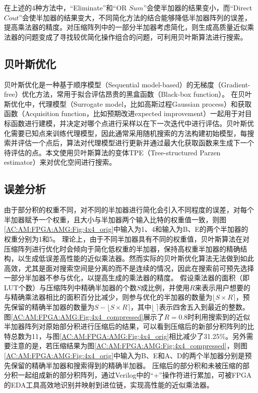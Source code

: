 在上述的4种方法中，“Eliminate”和“OR $Sum$”会使半加器的结果变小，而“Direct $Cout$”会使半加器的结果变大，不同简化方法的结合能够降低半加器阵列的误差，提高乘法器的精度。对压缩阵列中的一部分半加器考虑简化，则生成高质量近似乘法器的问题变成了寻找较优简化操作组合的问题，可利用贝叶斯算法进行搜索。

\subsection{贝叶斯优化}

贝叶斯优化\cite{BBO:BayesianNeuralIPS}是一种基于顺序模型（Sequential model-based）的无梯度（Gradient-free）优化方法，常用于拟合评估昂贵的黑盒函数（Black-box function）。
在贝叶斯优化中，代理模型（Surrogate model，比如高斯过程Gaussian process）和获取函数（Acquisition function，比如预期改进expected improvement）一起用于对目标函数进行建模，并决定对哪个点进行采样以在下一次迭代中进行评估。贝叶斯优化需要已知点来训练代理模型，因此通常采用随机搜索的方法构建初始模型，每搜索并评估一个点后，算法对代理模型进行更新并通过最大化获取函数来生成下一个待评估的点。本文使用贝叶斯算法的变体TPE（Tree-structured Parzen estimator）\cite{BBO:TPE}来对优化空间进行搜索。

\subsection{误差分析}

由于部分积的权重不同，对不同的半加器进行简化会引入不同程度的误差，对每个半加器赋予一个权重，且大小与半加器两个输入比特的权重值一致，则图\ref{AC:AM:FPGA:AMG:Fig:4x4_orig}中输入为1、4和输入为B、E的两个半加器的权重分别为1和5。
理论上，由于不同半加器具有不同的权重值，贝叶斯算法在对压缩阵列进行优化时会倾向于简化低权重的半加器，保持高权重半加器的精确结构，以生成低误差高性能的近似乘法器。然而实际的贝叶斯优化算法无法做到如此高效，尤其是面对搜索空间是分离的而不是连续的情况，因此在搜索前可预先选择一部分半加器不参与优化，以提高生成的乘法器的精度。
假设乘法器的面积（即LUT个数）与压缩阵列中精确半加器的个数$S$成比例，并使用$R$来表示用户想要的与精确乘法器相比的面积百分比减少，则参与优化的半加器的数量为$\lfloor S \times R \rceil$，预先保留的精确半加器的数量为$S - \lfloor S \times R \rceil$，其中$\lfloor \ \rceil$表示四舍五入到最近的整数。
图\ref{AC:AM:FPGA:AMG:Fig:4x4_compressed}展示了$R=0.8$时利用搜索到的近似半加器阵列对原始部分积进行压缩后的结果，可以看到压缩后的新部分积阵列的比特总数为11，与图\ref{AC:AM:FPGA:AMG:Fig:4x4_orig}相比减少了31.25\%。另外需要注意的是，若压缩结果为图\ref{AC:AM:FPGA:AMG:Fig:4x4_compressed}，则图\ref{AC:AM:FPGA:AMG:Fig:4x4_orig}中输入为B、E和A、D的两个半加器分别是预先保留的精确半加器和搜索得到的精确半加器。
压缩后的部分积和未被压缩的部分积一起组成新的部分积阵列，通过Verilog中的“+”操作符进行累加，可被FPGA的EDA工具高效地识别并映射到进位链，实现高性能的近似乘法器。


